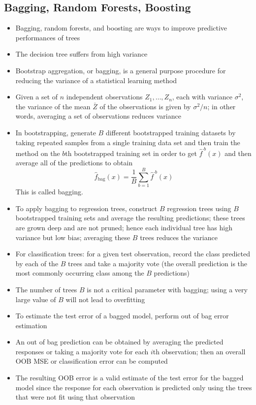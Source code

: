 \documentclass[12pt]{article}
\begin{document}
\subsection{Bagging, Random Forests, Boosting}
\begin{itemize} 
\item Bagging, random forests, and boosting are ways to improve predictive performances of trees 
\item The decision tree suffers from high variance
\item Bootstrap aggregation, or bagging, is a general purpose procedure for reducing the variance of a statistical learning method 
\item Given a set of $n$ independent observations $Z_1,\dots,Z_n$, each with variance $\sigma^2$, the variance of the mean $\bar{Z}$ of the observations is given by $\sigma^2 / n $; in other words, averaging a set of observations reduces variance 
\item In bootstrapping, generate $B$ different bootstrapped training datasets by taking repeated samples from a single training data set and then train the method on the $b$th bootstrapped training set in order to get $\hat{f}^{\cdot b} (x)$ and then average all of the predictions to obtain 
$$ \hat{f}_{\text{bag}}(x) = \frac{1}{B}\sum_{b=1}^B\hat{f}^{\cdot b}(x) $$ This is called bagging. 
\item To apply bagging to regression trees, construct $B$ regression trees using $B$ bootstrapped training sets and average the resulting predictions; these trees are grown deep and are not pruned; hence each individual tree has high variance but low bias; averaging these $B$ trees reduces the variance 
\item For classification trees: for a given test observation, record the class predicted by each of the $B$ trees and take a majority vote (the overall prediction is the most commonly occurring class among the $B$ predictions) 
\item The number of trees $B$ is not a critical parameter with bagging; using a very large value of $B$ will not lead to overfitting 
\item To estimate the test error of a bagged model, perform out of bag error estimation
\item An out of bag prediction can be obtained by averaging the predicted responses or taking a majority vote for each $i$th observation; then an overall OOB MSE or classification error can be computed 
\item The resulting OOB error is a valid estimate of the test error for the bagged model since the response for each observation is predicted only using the trees that were not fit using that observation 

\end{itemize}
\end{document}
